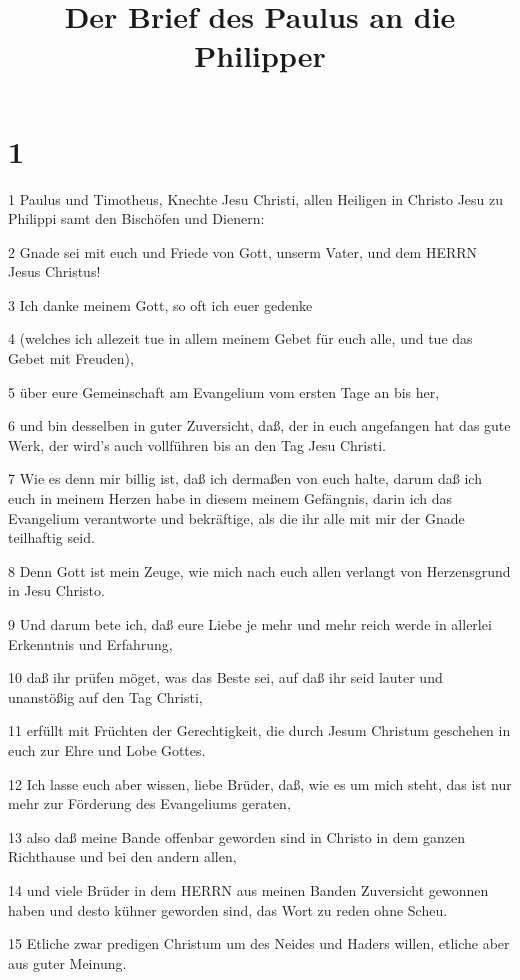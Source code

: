

\title{Der Brief des Paulus an die Philipper}


\chapter{1}

\par 1 Paulus und Timotheus, Knechte Jesu Christi, allen Heiligen in Christo Jesu zu Philippi samt den Bischöfen und Dienern:
\par 2 Gnade sei mit euch und Friede von Gott, unserm Vater, und dem HERRN Jesus Christus!
\par 3 Ich danke meinem Gott, so oft ich euer gedenke
\par 4 (welches ich allezeit tue in allem meinem Gebet für euch alle, und tue das Gebet mit Freuden),
\par 5 über eure Gemeinschaft am Evangelium vom ersten Tage an bis her,
\par 6 und bin desselben in guter Zuversicht, daß, der in euch angefangen hat das gute Werk, der wird's auch vollführen bis an den Tag Jesu Christi.
\par 7 Wie es denn mir billig ist, daß ich dermaßen von euch halte, darum daß ich euch in meinem Herzen habe in diesem meinem Gefängnis, darin ich das Evangelium verantworte und bekräftige, als die ihr alle mit mir der Gnade teilhaftig seid.
\par 8 Denn Gott ist mein Zeuge, wie mich nach euch allen verlangt von Herzensgrund in Jesu Christo.
\par 9 Und darum bete ich, daß eure Liebe je mehr und mehr reich werde in allerlei Erkenntnis und Erfahrung,
\par 10 daß ihr prüfen möget, was das Beste sei, auf daß ihr seid lauter und unanstößig auf den Tag Christi,
\par 11 erfüllt mit Früchten der Gerechtigkeit, die durch Jesum Christum geschehen in euch zur Ehre und Lobe Gottes.
\par 12 Ich lasse euch aber wissen, liebe Brüder, daß, wie es um mich steht, das ist nur mehr zur Förderung des Evangeliums geraten,
\par 13 also daß meine Bande offenbar geworden sind in Christo in dem ganzen Richthause und bei den andern allen,
\par 14 und viele Brüder in dem HERRN aus meinen Banden Zuversicht gewonnen haben und desto kühner geworden sind, das Wort zu reden ohne Scheu.
\par 15 Etliche zwar predigen Christum um des Neides und Haders willen, etliche aber aus guter Meinung.
